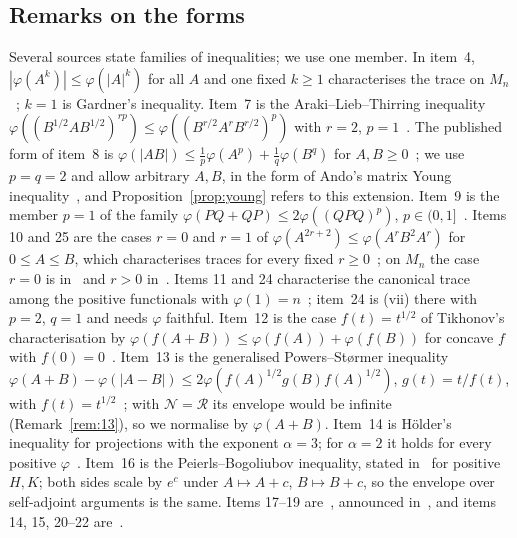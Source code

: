 \documentclass[11pt]{article}
\newcommand{\cR}{\mathcal{R}}
\newcommand{\cN}{\mathcal{N}}
\theoremstyle{plain}
\theoremstyle{definition}
\theoremstyle{remark}
\begin{document}
\subsection{Remarks on the forms}\label{sec:forms}
Several sources state families of inequalities; we use one member. In item~4, $|\varphi(A^k)|\le\varphi(|A|^k)$ for all
$A$ and one fixed $k\ge1$ characterises the trace on $M_n$~\cite[Theorem~1]{petz1988}; $k=1$ is Gardner's inequality.
Item~7 is the Araki--Lieb--Thirring inequality $\varphi((B^{1/2}AB^{1/2})^{rp})\le\varphi((B^{r/2}A^rB^{r/2})^p)$ with
$r=2$, $p=1$~\cite[Lemma~2]{bikchentaev2011pb}. The published form of item~8 is $\varphi(|AB|)\le\frac1p\varphi(A^p)+
\frac1q\varphi(B^q)$ for $A,B\ge0$~\cite{bikchentaev2005young}; we use $p=q=2$ and allow arbitrary $A,B$, in the form of
Ando's matrix Young inequality~\cite{ando1995}, and Proposition~\ref{prop:young} refers to this extension. Item~9 is the
member $p=1$ of the family $\varphi(PQ+QP)\le2\varphi((QPQ)^p)$, $p\in(0,1]$~\cite{bikchentaev2019abed}. Items 10 and 25
are the cases $r=0$ and $r=1$ of $\varphi(A^{2r+2})\le\varphi(A^rB^2A^r)$ for $0\le A\le B$, which characterises traces for
every fixed $r\ge0$~\cite[Lemma~1, Theorems~4,~5]{hoa2010}; on $M_n$ the case $r=0$ is
in~\cite{bikchentaev2007mono,sano2006} and $r>0$ in~\cite[Theorem~6]{hoa2007}. Items 11 and 24 characterise the
canonical trace among the positive functionals with $\varphi(1)=n$~\cite[Theorem~3]{bikchentaev2020det}; item~24 is (vii)
there with $p=2$, $q=1$ and needs $\varphi$ faithful. Item~12 is the case $f(t)=t^{1/2}$ of Tikhonov's
characterisation by $\varphi(f(A+B))\le\varphi(f(A))+\varphi(f(B))$ for concave $f$ with
$f(0)=0$~\cite[Corollary~1]{tikhonov2005}. Item~13 is the generalised Powers--St{\o}rmer inequality
$\varphi(A+B)-\varphi(|A-B|)\le2\varphi(f(A)^{1/2}g(B)f(A)^{1/2})$, $g(t)=t/f(t)$, with $f(t)=t^{1/2}$~\cite[Lemma~3.1,
Remark~4]{hoa2013}; with $\cN=\cR$ its envelope would be infinite (Remark~\ref{rem:13}), so we normalise by $\varphi(A+B)$.
Item~14 is Hölder's inequality for projections with the exponent $\alpha=3$; for $\alpha=2$ it holds for every positive
$\varphi$~\cite[remark after Theorem~2]{bikchentaev2011mn}. Item~16 is the Peierls--Bogoliubov inequality, stated
in~\cite{bikchentaev2011pb} for positive $H,K$; both sides scale by $e^c$ under $A\mapsto A+c$, $B\mapsto B+c$, so the
envelope over self-adjoint arguments is the same. Items 17--19 are~\cite[Theorem~3.4]{bikchentaev2010smj}, announced
in~\cite{bikchentaev2009rm}, and items 14, 15, 20--22 are~\cite[Theorem~2]{bikchentaev2011mn}.
\end{document}
